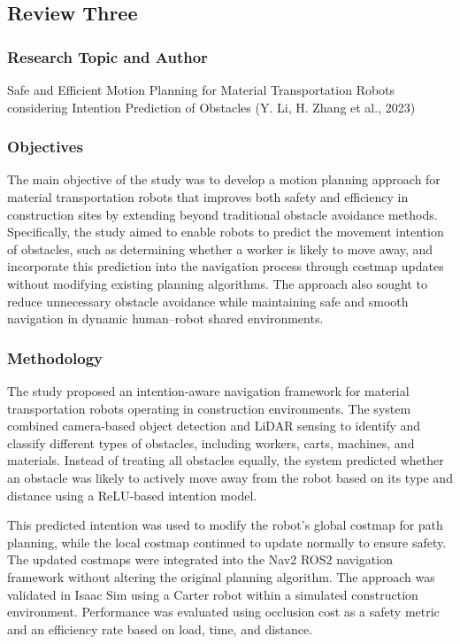 \subsection{Review Three}

\subsubsection{Research Topic and Author}

Safe and Efficient Motion Planning for Material Transportation Robots considering Intention Prediction of Obstacles (Y. Li, H. Zhang et al., 2023)

\subsubsection{Objectives}

The main objective of the study was to develop a motion planning approach for material transportation robots that improves both safety and efficiency in construction sites by extending beyond traditional obstacle avoidance methods. Specifically, the study aimed to enable robots to predict the movement intention of obstacles, such as determining whether a worker is likely to move away, and incorporate this prediction into the navigation process through costmap updates without modifying existing planning algorithms. The approach also sought to reduce unnecessary obstacle avoidance while maintaining safe and smooth navigation in dynamic human–robot shared environments.

\subsubsection{Methodology}

The study proposed an intention-aware navigation framework for material transportation robots operating in construction environments. The system combined camera-based object detection and LiDAR sensing to identify and classify different types of obstacles, including workers, carts, machines, and materials. Instead of treating all obstacles equally, the system predicted whether an obstacle was likely to actively move away from the robot based on its type and distance using a ReLU-based intention model.

This predicted intention was used to modify the robot’s global costmap for path planning, while the local costmap continued to update normally to ensure safety. The updated costmaps were integrated into the Nav2 ROS2 navigation framework without altering the original planning algorithm. The approach was validated in Isaac Sim using a Carter robot within a simulated construction environment. Performance was evaluated using occlusion cost as a safety metric and an efficiency rate based on load, time, and distance.

